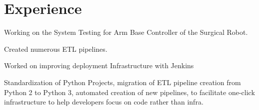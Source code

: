 \documentclass[]{deedy-resume-openfont}
\begin{document}
\begin{minipage}[t]{0.66\textwidth} 


\section{Experience}



\vspace{\topsep} %
\begin{tightemize}

\item Working on the System Testing for Arm Base Controller of the Surgical Robot.
\end{tightemize}
\sectionsep

\vspace{\topsep} %
\begin{tightemize}

\item Created numerous ETL pipelines.
\item Worked on improving deployment Infrastructure with Jenkins
\item Standardization of Python Projects, migration of ETL pipeline creation from Python 2 to Python 3, automated creation of new pipelines, to facilitate one-click infrastructure to help developers focus on code rather than infra.
\end{tightemize}
\sectionsep


\end{minipage}
\end{document}

